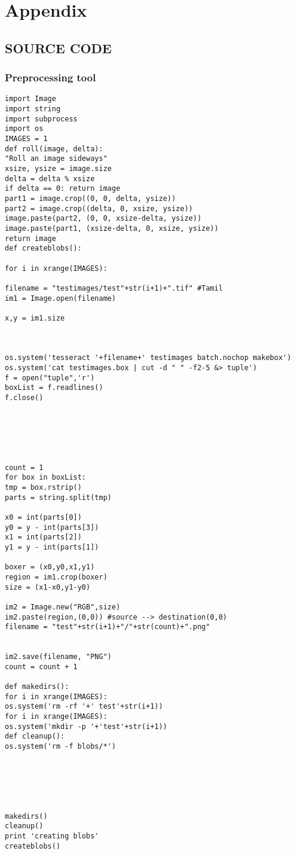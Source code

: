 \chapter{Appendix}

\section{SOURCE CODE}


\subsection{Preprocessing tool}
\begin{verbatim}
import Image
import string
import subprocess
import os
IMAGES = 1
def roll(image, delta):
"Roll an image sideways"
xsize, ysize = image.size
delta = delta % xsize
if delta == 0: return image
part1 = image.crop((0, 0, delta, ysize))
part2 = image.crop((delta, 0, xsize, ysize))
image.paste(part2, (0, 0, xsize-delta, ysize))
image.paste(part1, (xsize-delta, 0, xsize, ysize))
return image
def createblobs():

for i in xrange(IMAGES):

filename = "testimages/test"+str(i+1)+".tif" #Tamil
im1 = Image.open(filename)

x,y = im1.size



os.system('tesseract '+filename+' testimages batch.nochop makebox')
os.system('cat testimages.box | cut -d " " -f2-5 &> tuple')
f = open("tuple",'r')
boxList = f.readlines()
f.close()






count = 1
for box in boxList:
tmp = box.rstrip()
parts = string.split(tmp)

x0 = int(parts[0])
y0 = y - int(parts[3])
x1 = int(parts[2])
y1 = y - int(parts[1])

boxer = (x0,y0,x1,y1)
region = im1.crop(boxer)
size = (x1-x0,y1-y0)

im2 = Image.new("RGB",size)
im2.paste(region,(0,0)) #source --> destination(0,0)
filename = "test"+str(i+1)+"/"+str(count)+".png"


im2.save(filename, "PNG")
count = count + 1

def makedirs():
for i in xrange(IMAGES):
os.system('rm -rf '+' test'+str(i+1))
for i in xrange(IMAGES):
os.system('mkdir -p '+'test'+str(i+1))
def cleanup():
os.system('rm -f blobs/*')






makedirs()
cleanup()
print 'creating blobs'
createblobs()

\end{verbatim}


